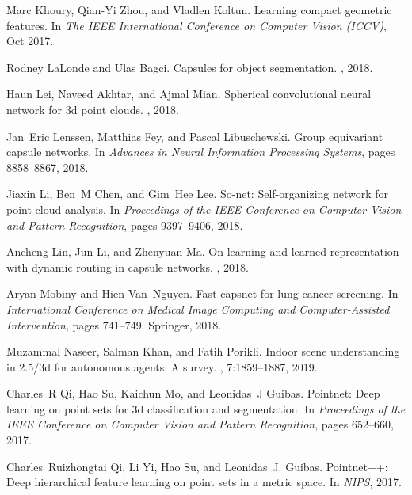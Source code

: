 \documentclass[10pt,twocolumn,letterpaper]{article}
\theoremstyle{break}
\begin{document}
{\begin{thebibliography}{10}
Marc Khoury, Qian-Yi Zhou, and Vladlen Koltun.
\newblock Learning compact geometric features.
\newblock In {\em The IEEE International Conference on Computer Vision (ICCV)},
  Oct 2017.

Rodney LaLonde and Ulas Bagci.
\newblock Capsules for object segmentation.
, 2018.

Haun Lei, Naveed Akhtar, and Ajmal Mian.
\newblock Spherical convolutional neural network for 3d point clouds.
, 2018.

Jan~Eric Lenssen, Matthias Fey, and Pascal Libuschewski.
\newblock Group equivariant capsule networks.
\newblock In {\em Advances in Neural Information Processing Systems}, pages
  8858--8867, 2018.

Jiaxin Li, Ben~M Chen, and Gim~Hee Lee.
\newblock So-net: Self-organizing network for point cloud analysis.
\newblock In {\em Proceedings of the IEEE Conference on Computer Vision and
  Pattern Recognition}, pages 9397--9406, 2018.

Ancheng Lin, Jun Li, and Zhenyuan Ma.
\newblock On learning and learned representation with dynamic routing in
  capsule networks.
, 2018.

Aryan Mobiny and Hien Van~Nguyen.
\newblock Fast capsnet for lung cancer screening.
\newblock In {\em International Conference on Medical Image Computing and
  Computer-Assisted Intervention}, pages 741--749. Springer, 2018.

Muzammal Naseer, Salman Khan, and Fatih Porikli.
\newblock Indoor scene understanding in 2.5/3d for autonomous agents: A survey.
, 7:1859--1887, 2019.

Charles~R Qi, Hao Su, Kaichun Mo, and Leonidas~J Guibas.
\newblock Pointnet: Deep learning on point sets for 3d classification and
  segmentation.
\newblock In {\em Proceedings of the IEEE Conference on Computer Vision and
  Pattern Recognition}, pages 652--660, 2017.

Charles~Ruizhongtai Qi, Li Yi, Hao Su, and Leonidas~J. Guibas.
\newblock Pointnet++: Deep hierarchical feature learning on point sets in a
  metric space.
\newblock In {\em NIPS}, 2017.


\end{thebibliography}}
\end{document}
